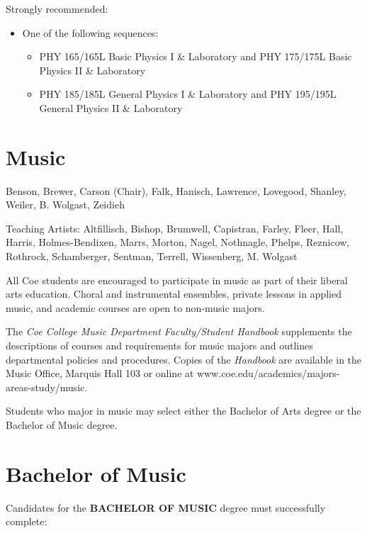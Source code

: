 \documentclass[
  letterpaper,
]{scrbook}
\providecommand{\tightlist}{%
  \setlength{\itemsep}{0pt}\setlength{\parskip}{0pt}}
\begin{document}
Strongly recommended:

\begin{itemize}
\tightlist
\item
  One of the following sequences:

  \begin{itemize}
  \tightlist
  \item
    PHY 165/165L Basic Physics I \& Laboratory and PHY 175/175L Basic
    Physics II \& Laboratory
  \item
    PHY 185/185L General Physics I \& Laboratory and PHY 195/195L
    General Physics II \& Laboratory
  \end{itemize}
\end{itemize}

\section{Music}\label{sec-music}

Benson, Brewer, Carson (Chair), Falk, Hanisch, Lawrence, Lovegood,
Shanley, Weiler, B. Wolgast, Zeidieh

Teaching Artists: Altfillisch, Bishop, Brumwell, Capistran, Farley,
Fleer, Hall, Harris, Holmes-Bendixen, Marrs, Morton, Nagel, Nothnagle,
Phelps, Reznicow, Rothrock, Schamberger, Sentman, Terrell, Wissenberg,
M. Wolgast

All Coe students are encouraged to participate in music as part of their
liberal arts education. Choral and instrumental ensembles, private
lessons in applied music, and academic courses are open to non-music
majors.

The \emph{Coe College Music Department Faculty/Student Handbook}
supplements the descriptions of courses and requirements for music
majors and outlines departmental policies and procedures. Copies of the
\emph{Handbook} are available in the Music Office, Marquis Hall 103 or
online at www.coe.edu/academics/majors-areas-study/music.

Students who major in music may select either the Bachelor of Arts
degree or the Bachelor of Music degree.

\section{Bachelor of Music}\label{bachelor-of-music}

Candidates for the \textbf{BACHELOR OF MUSIC} degree must successfully
complete:
\end{document}
